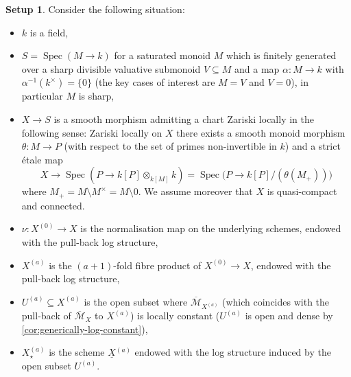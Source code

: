\documentclass[a4paper,twoside,11pt,reqno]{amsart}
\newcommand{\cM}{{\mathcal M}}
\newcommand{\la}{\longrightarrow}
\DeclareMathOperator{\Spec}{Spec}
\theoremstyle{definition}
\newtheorem{setup}[thm]{Setup}
\numberwithin{equation}{subsection}
\begin{document}
\begin{setup} \label{setup:surgery}
Consider the following situation: 
\begin{itemize}
    \item 
    $k$ is a field,
    
    \item 
    $S = \Spec(M\to k)$ for a saturated monoid $M$ which is finitely generated over a sharp divisible valuative submonoid $V\subseteq M$ and a map $\alpha\colon M\to k$ with $\alpha^{-1}(k^\times) = \{0\}$ (the key cases of interest are $M=V$ and $V=0$), in particular $M$ is sharp,
    
    \item 
    $X\to S$ is a smooth morphism admitting a chart Zariski locally in the following sense: Zariski locally on $X$ there exists a smooth monoid morphism $\theta\colon M\to P$ (with respect to the set of primes non-invertible in $k$) and a strict \'etale map
    \[
        X \la \Spec(P\to k[P]\otimes_{k[M]} k) = \Spec\big(P\to k[P]/(\theta(M_+))\big)
    \]
    where $M_+ = M\setminus M^\times = M \setminus 0$.
    We assume moreover that $X$ is quasi-compact and connected.
     
    \item $\nu\colon X^{(0)}\to X$ is the normalisation map on the underlying schemes, endowed with the pull-back log structure,
    
    \item $X^{(a)}$ is the $(a+1)$-fold fibre product of $X^{(0)}\to X$, endowed with the pull-back log structure,
    
    \item $U^{(a)}\subseteq X^{(a)}$ is the open subset where $\overline{\cM}_{X^{(a)}}$ (which coincides with the pull-back of $\overline{\cM}_X$ to $X^{(a)}$) is locally constant ($U^{(a)}$ is open and dense by \cref{cor:generically-log-constant}),
    
    \item $X^{(a)}_\star$ is the scheme $\underline{X}{}^{(a)}$ endowed with the log structure induced by the open subset $U^{(a)}$.
\end{itemize}
\end{setup}
\end{document}
